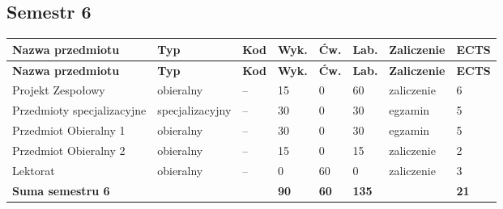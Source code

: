 \documentclass[12pt,a4paper]{article}
\newcommand{\thdrule}{\noalign{\global\setlength{\extrarowheight}{0pt}}}
\newcommand{\thdend}{\noalign{\global\setlength{\extrarowheight}{4pt}}}
\begin{document}
\subsection*{Semestr 6}

{\scriptsize
\begin{longtable}{m{5.0cm}m{1.9cm}m{0.75cm}m{0.85cm}m{0.85cm}m{0.85cm}m{1.45cm}m{0.9cm}}
\thdrule\toprule
\rowcolor{pjatkRed}
{\color{white}\footnotesize\textbf{\vphantom{Ag}Nazwa przedmiotu}} & {\color{white}\footnotesize\textbf{\vphantom{Ag}Typ}} & {\color{white}\footnotesize\textbf{\vphantom{Ag}Kod}} & {\color{white}\footnotesize\textbf{\vphantom{Ag}Wyk.}} & {\color{white}\footnotesize\textbf{\vphantom{Ag}Ćw.}} & {\color{white}\footnotesize\textbf{\vphantom{Ag}Lab.}} & {\color{white}\footnotesize\textbf{\vphantom{Ag}Zaliczenie}} & {\color{white}\footnotesize\textbf{\vphantom{Ag}ECTS}} \\
\midrule\thdend
\endfirsthead
\thdrule\toprule
\rowcolor{pjatkRed}
{\color{white}\footnotesize\textbf{\vphantom{Ag}Nazwa przedmiotu}} & {\color{white}\footnotesize\textbf{\vphantom{Ag}Typ}} & {\color{white}\footnotesize\textbf{\vphantom{Ag}Kod}} & {\color{white}\footnotesize\textbf{\vphantom{Ag}Wyk.}} & {\color{white}\footnotesize\textbf{\vphantom{Ag}Ćw.}} & {\color{white}\footnotesize\textbf{\vphantom{Ag}Lab.}} & {\color{white}\footnotesize\textbf{\vphantom{Ag}Zaliczenie}} & {\color{white}\footnotesize\textbf{\vphantom{Ag}ECTS}} \\
\midrule\thdend
\endhead
\rowcolor{tableElective} Projekt Zespołowy & {\scriptsize obieralny} & -- & 15 & 0 & 60 & {\scriptsize zaliczenie} & 6 \\
\rowcolor{tableElective} Przedmioty specjalizacyjne & {\scriptsize specjalizacyjny} & -- & 30 & 0 & 30 & {\scriptsize egzamin} & 5 \\
\rowcolor{tableElective} Przedmiot Obieralny 1 & {\scriptsize obieralny} & -- & 30 & 0 & 30 & {\scriptsize egzamin} & 5 \\
\rowcolor{tableElective} Przedmiot Obieralny 2 & {\scriptsize obieralny} & -- & 15 & 0 & 15 & {\scriptsize zaliczenie} & 2 \\
\rowcolor{tableElective} Lektorat & {\scriptsize obieralny} & -- & 0 & 60 & 0 & {\scriptsize zaliczenie} & 3 \\
\midrule[\heavyrulewidth]
\rowcolor{tableSummary} \textbf{Suma semestru 6} & & & \textbf{90} & \textbf{60} & \textbf{135} & & \textbf{21} \\
\bottomrule
\end{longtable}}
\end{document}
